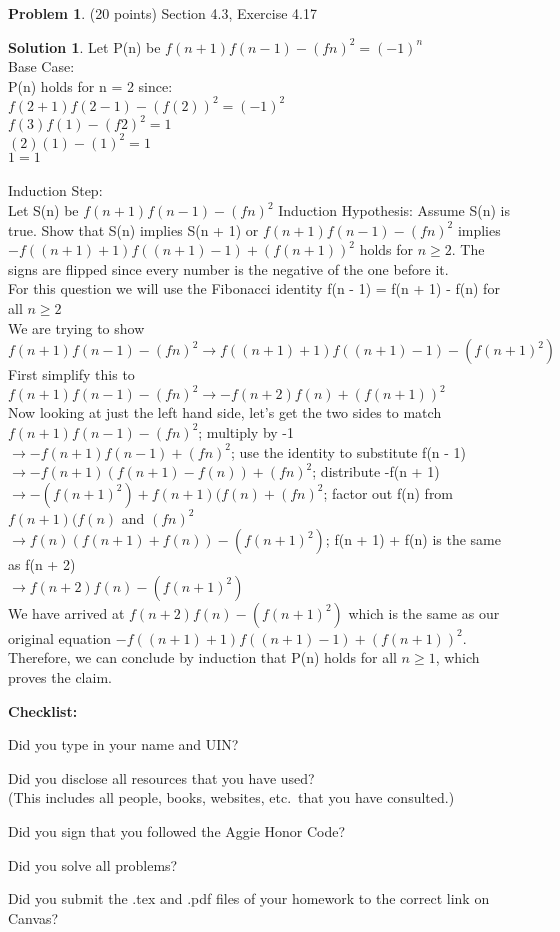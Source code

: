 \documentclass{article}
\theoremstyle{definition}
\newtheorem{problem}{Problem}
\newtheorem*{solution}{Solution}
\newcommand{\checklist}{\noindent\textbf{Checklist:}
\begin{compactitem}[$\Box$] 
\item Did you type in your name and UIN? 
\item Did you disclose all resources that you have used? \\
(This includes all people, books, websites, etc.\ that you have consulted.)
\item Did you sign that you followed the Aggie Honor Code? 
\item Did you solve all problems? 
\item Did you submit the .tex and .pdf files of your homework to the correct link on Canvas? 
\end{compactitem}
}
\begin{document}
\begin{problem} (20 points) Section 4.3, Exercise 4.17
\end{problem}
\begin{solution} 
Let P(n) be $f(n + 1)f(n - 1) - (fn)^2 = (-1)^n$ \\
Base Case: \\
P(n) holds for n = 2 since: \\
$f(2 + 1)f(2 - 1) - (f(2))^2 = (-1)^2$ \\
$f(3)f(1) - (f2)^2 = 1$ \\
$(2)(1) - (1)^2 = 1$ \\
$1 = 1$ \\
\\
Induction Step: \\
Let S(n) be $f(n + 1)f(n - 1) - (fn)^2$
Induction Hypothesis: Assume S(n) is true. Show that S(n) implies S(n + 1) or $f(n + 1)f(n - 1) - (fn)^2$ implies \\
$- f((n + 1) + 1)f((n + 1) - 1) + (f(n + 1))^2$ holds for $n \geqslant 2$. The signs are flipped since every number is the negative of the one before it.\\
For this question we will use the Fibonacci identity f(n - 1) = f(n + 1) - f(n) for all $n \geqslant 2$ \\
We are trying to show $f(n + 1)f(n - 1) - (fn)^2 \to f((n + 1) + 1)f((n + 1) - 1) - (f(n + 1)^2)$ \\
First simplify this to $f(n + 1)f(n - 1) - (fn)^2 \to -f(n + 2)f(n) + (f(n + 1))^2$ \\
Now looking at just the left hand side, let's get the two sides to match \\
$f(n + 1)f(n - 1) - (fn)^2$; multiply by -1 \\
$\to -f(n + 1)f(n - 1) + (fn)^2$; use the identity to substitute f(n - 1) \\
$\to -f(n + 1)(f(n + 1) - f(n)) + (fn)^2$; distribute -f(n + 1) \\
$\to -(f(n + 1)^2) + f(n + 1)(f(n) + (fn)^2$; factor out f(n) from $f(n + 1)(f(n)$ and $(fn)^2$ \\
$\to f(n)(f(n + 1) + f(n)) - (f(n + 1)^2)$; f(n + 1) + f(n) is the same as f(n + 2) \\
$\to f(n + 2)f(n) - (f(n + 1)^2)$ \\
We have arrived at $f(n + 2)f(n) - (f(n + 1)^2)$ which is the same as our original equation $- f((n + 1) + 1)f((n + 1) - 1) + (f(n + 1))^2$.
Therefore, we can conclude by induction that P(n) holds for all $n \geqslant 1$, which proves the claim.
\end{solution}

\goodbreak
\checklist
\end{document}
